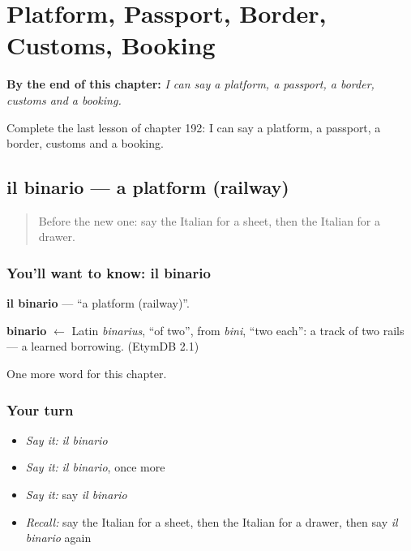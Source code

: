 
\chapter{Platform, Passport, Border, Customs, Booking}
\label{ch:it-platform-passport-border-customs-booking}

\begin{chapteropening}
\textbf{By the end of this chapter:} \emph{I can say a platform, a passport, a border, customs and a booking.}

Complete the last lesson of chapter 192: I can say a platform, a passport, a border, customs and a booking.
\end{chapteropening}

\section[il binario]{il binario — a platform (railway)}

\label{lesson:IT-C192-binario}



\begin{quote}
Before the new one: say the Italian for a sheet, then the Italian for a drawer.
\end{quote}

\subsection*{You'll want to know: il binario}
\textbf{il binario} — \textquotedblleft{}a platform (railway)\textquotedblright{}.

\begin{cousinweb}
\textbf{binario} $\leftarrow$ Latin \emph{binarius}, \textquotedblleft{}of two\textquotedblright{}, from \emph{bini}, \textquotedblleft{}two each\textquotedblright{}: a track of two rails — a learned borrowing. (EtymDB 2.1)
\end{cousinweb}

\begin{grammarlens}[title={What you've built}]
One more word for this chapter.
\end{grammarlens}

\subsection*{Your turn}
\begin{itemize}
\raggedright
  \item \emph{Say it:} \emph{il binario}
  \item \emph{Say it:} \emph{il binario}, once more
  \item \emph{Say it:} say \emph{il binario}
  \item \emph{Recall:} say the Italian for a sheet, then the Italian for a drawer, then say \emph{il binario} again
\end{itemize}

